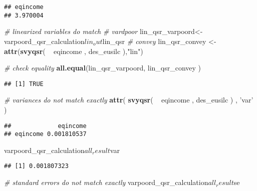 \documentclass[]{book}
\newenvironment{Shaded}{\begin{snugshade}}{\end{snugshade}}
\newcommand{\KeywordTok}[1]{\textcolor[rgb]{0.13,0.29,0.53}{\textbf{{#1}}}}
\newcommand{\StringTok}[1]{\textcolor[rgb]{0.31,0.60,0.02}{{#1}}}
\newcommand{\CommentTok}[1]{\textcolor[rgb]{0.56,0.35,0.01}{\textit{{#1}}}}
\newcommand{\NormalTok}[1]{{#1}}
\begin{document}
\begin{verbatim}
## eqincome 
## 3.970004
\end{verbatim}

\begin{Shaded}
\begin{Highlighting}[]
\CommentTok{# linearized variables do match}
\CommentTok{# vardpoor}
\NormalTok{lin_qsr_varpoord<-}\StringTok{ }\NormalTok{varpoord_qsr_calculation$lin_out$lin_qsr}
\CommentTok{# convey }
\NormalTok{lin_qsr_convey <-}\StringTok{ }\KeywordTok{attr}\NormalTok{(}\KeywordTok{svyqsr}\NormalTok{( ~}\StringTok{ }\NormalTok{eqincome , des_eusilc ),}\StringTok{"lin"}\NormalTok{)}

\CommentTok{# check equality}
\KeywordTok{all.equal}\NormalTok{(lin_qsr_varpoord, lin_qsr_convey )}
\end{Highlighting}
\end{Shaded}

\begin{verbatim}
## [1] TRUE
\end{verbatim}

\begin{Shaded}
\begin{Highlighting}[]
\CommentTok{# variances do not match exactly}
\KeywordTok{attr}\NormalTok{( }\KeywordTok{svyqsr}\NormalTok{( ~}\StringTok{ }\NormalTok{eqincome , des_eusilc ) , }\StringTok{'var'} \NormalTok{)}
\end{Highlighting}
\end{Shaded}

\begin{verbatim}
##             eqincome
## eqincome 0.001810537
\end{verbatim}

\begin{Shaded}
\begin{Highlighting}[]
\NormalTok{varpoord_qsr_calculation$all_result$var}
\end{Highlighting}
\end{Shaded}

\begin{verbatim}
## [1] 0.001807323
\end{verbatim}

\begin{Shaded}
\begin{Highlighting}[]
\CommentTok{# standard errors do not match exactly}
\NormalTok{varpoord_qsr_calculation$all_result$se}
\end{Highlighting}
\end{Shaded}
\end{document}
